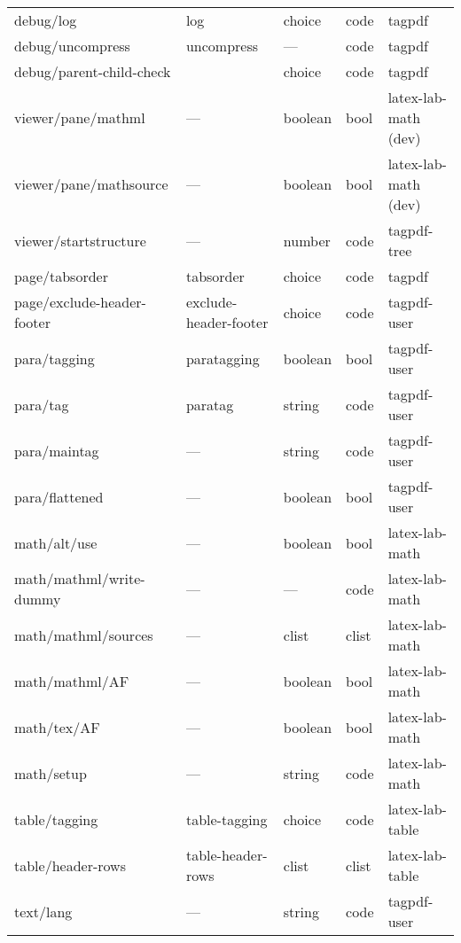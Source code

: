 \begin{longtable}{lllll}
debug/log        & log             & choice           &code  & tagpdf \\
debug/uncompress & uncompress      &  ---             &code  & tagpdf\\
debug/parent-child-check &         & choice           &code  &tagpdf   
\\[4pt]\midrule  
viewer/pane/mathml &  ---          &  boolean         &bool  &latex-lab-math (dev)\\
viewer/pane/mathsource& ---        &boolean           &bool  &latex-lab-math (dev)\\
viewer/startstructure & ---        &number            &code  &tagpdf-tree \\[4pt]\midrule
page/tabsorder  &tabsorder         & choice          & code & tagpdf\\   
page/exclude-header-footer & exclude-header-footer &choice & code &tagpdf-user\\[4pt]\midrule
para/tagging     &paratagging      &boolean          &bool  &tagpdf-user\\
para/tag         &paratag          &string           &code  &tagpdf-user\\
para/maintag     &---              &string           &code  &tagpdf-user\\
para/flattened   &---              &boolean          &bool  &tagpdf-user\\[4pt]\midrule
math/alt/use     &---              &boolean          &bool  &latex-lab-math\\
math/mathml/write-dummy & ---      &---              &code  &latex-lab-math\\
math/mathml/sources &---           & clist           &clist &latex-lab-math\\
math/mathml/AF      &---           &boolean          &bool  &latex-lab-math\\
math/tex/AF       & ---            &boolean          &bool  &latex-lab-math\\
math/setup        & ---            &string           &code  &latex-lab-math\\  [4pt]\midrule
table/tagging     & table-tagging  &choice           &code  &latex-lab-table\\
table/header-rows & table-header-rows& clist         &clist &latex-lab-table\\[4pt]\midrule
text/lang         & ---             & string         & code &tagpdf-user  
\\\bottomrule
\end{longtable}
